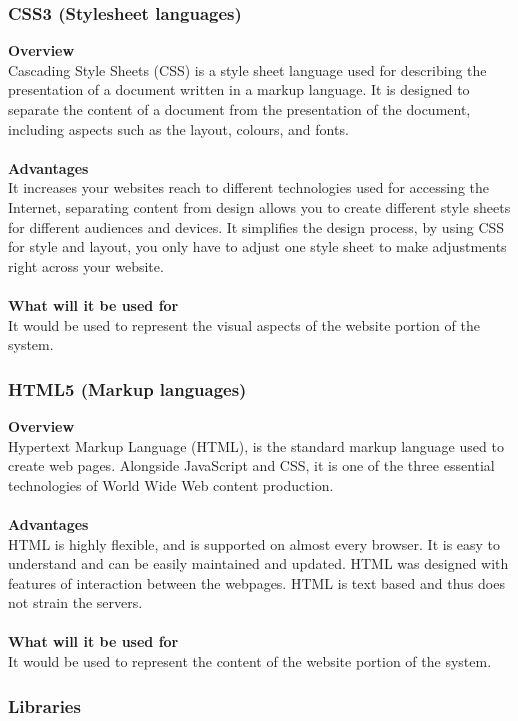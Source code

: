 \documentclass{article}
\begin{document}
\subsubsection*{CSS3 (Stylesheet languages)}
\textbf{Overview}\\
Cascading Style Sheets (CSS) is a style sheet language used for describing the presentation of a document written in a markup language. It is designed to separate the content of a document from the presentation of the document, including aspects such as the layout, colours, and fonts.\\\\
\textbf{Advantages}\\
It increases your websites reach to different technologies used for accessing the Internet, separating content from design allows you to create different style sheets for different audiences and devices. It simplifies the design process, by using CSS for style and layout, you only have to adjust one style sheet to make adjustments right across your website.\\\\
\textbf{What will it be used for}\\
It would be used to represent the visual aspects of the website portion of the system.

\subsubsection*{HTML5 (Markup languages)}
\textbf{Overview}\\
Hypertext Markup Language (HTML), is the standard markup language used to create web pages. Alongside JavaScript and CSS, it is one of the three essential technologies of World Wide Web content production.\\\\
\textbf{Advantages}\\
HTML is highly flexible, and is supported on almost every browser. It is easy to understand and can be easily maintained and updated. HTML was designed with features of interaction between the webpages. HTML is text based and thus does not strain the servers.\\\\
\textbf{What will it be used for}\\
It would be used to represent the content of the website portion of the system.

\subsubsection{Libraries}
\end{document}
